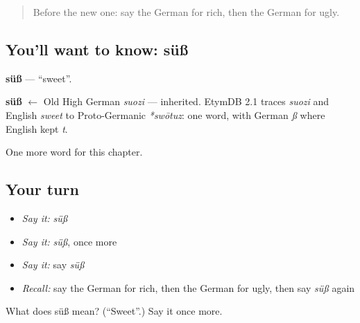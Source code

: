 \begin{quote}
Before the new one: say the German for rich, then the German for ugly.
\end{quote}

\subsection*{You'll want to know: süß}
\textbf{süß} — \textquotedblleft{}sweet\textquotedblright{}.

\begin{cousinweb}
\textbf{süß} $\leftarrow$ Old High German \emph{suozi} — inherited. EtymDB 2.1 traces \emph{suozi} and English \emph{sweet} to Proto-Germanic \emph{*swōtuz}: one word, with German \emph{ß} where English kept \emph{t}.
\end{cousinweb}

\begin{grammarlens}[title={What you've built}]
One more word for this chapter.
\end{grammarlens}

\subsection*{Your turn}
\begin{itemize}
\raggedright
  \item \emph{Say it:} \emph{süß}
  \item \emph{Say it:} \emph{süß}, once more
  \item \emph{Say it:} say \emph{süß}
  \item \emph{Recall:} say the German for rich, then the German for ugly, then say \emph{süß} again
\end{itemize}

\begin{tcolorbox}[breakable,colback=teal!4,colframe=teal!35!black,title={Before you move on}]
What does süß mean? (\textquotedblleft{}Sweet\textquotedblright{}.) Say it once more.
\end{tcolorbox}
